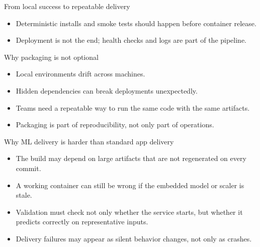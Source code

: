\begin{frame}{From local success to repeatable delivery}
\centering
{}
\vspace{0.7em}
\begin{itemize}
\item Deterministic installs and smoke tests should happen before container release.
\item Deployment is not the end; health checks and logs are part of the pipeline.
\end{itemize}
\coursefooter
\end{frame}

\begin{frame}{Why packaging is not optional}
\begin{itemize}
\item Local environments drift across machines.
\item Hidden dependencies can break deployments unexpectedly.
\item Teams need a repeatable way to run the same code with the same artifacts.
\item Packaging is part of reproducibility, not only part of operations.
\end{itemize}
\coursefooter
\end{frame}

\begin{frame}{Why ML delivery is harder than standard app delivery}
\begin{itemize}
\item The build may depend on large artifacts that are not regenerated on every commit.
\item A working container can still be wrong if the embedded model or scaler is stale.
\item Validation must check not only whether the service starts, but whether it predicts correctly on representative inputs.
\item Delivery failures may appear as silent behavior changes, not only as crashes.
\end{itemize}
\coursefooter
\end{frame}

